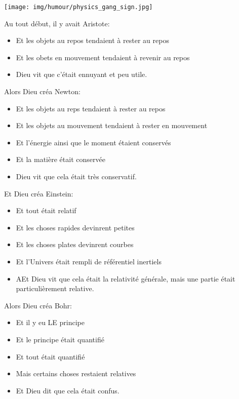 \begin{center}\underline{\hspace{5 cm}}\end{center}

	\begin{center}
		\texttt{[image: img/humour/physics\_gang\_sign.jpg]}
	\end{center}
	\pagebreak

Au tout début, il y avait Aristote:
\begin{itemize}
	\item Et les objets au repos tendaient à rester au repos
	\item Et les obets en mouvement tendaient à revenir au repos
	\item Dieu vit que c'était ennuyant et peu utile.
\end{itemize}

Alors Dieu créa Newton:
\begin{itemize}
	\item Et les objets au reps tendaient à rester au repos
	\item Et les objets au mouvement tendaient à rester en mouvement
	\item Et l'énergie ainsi que le moment étaient conservés
	\item Et la matière était conservée
	\item Dieu vit que cela était très conservatif.
\end{itemize}

Et Dieu créa Einstein:
\begin{itemize}
	\item Et tout était relatif
	\item Et les choses rapides devinrent petites
	\item Et les choses plates devinrent courbes
	\item Et l'Univers était rempli de référentiel inertiels
	\item AEt Dieu vit que cela était la relativité générale, mais une partie était particulièrement relative.
\end{itemize}

Alors Dieu créa Bohr:
\begin{itemize}
	\item Et il y eu LE principe
	\item Et le principe était quantifié
	\item Et tout était quantifié
	\item Mais certains choses restaient relatives
	\item Et Dieu dit que cela était confus.
\end{itemize}

